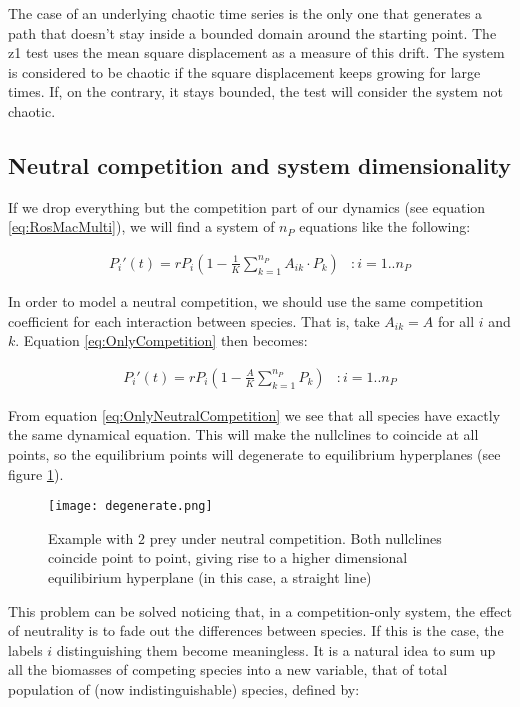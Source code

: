The case of an underlying chaotic time series is the only one that generates a path that doesn't stay inside a bounded domain around the starting point. The z1 test uses the mean square displacement as a measure of this drift. The system is considered to be chaotic if the square displacement keeps growing for large times. If, on the contrary, it stays bounded, the test will consider the system not chaotic.

\subsection{Neutral competition and system dimensionality}
\label{subsec:NeutralCompetition}
If we drop everything but the competition part of our dynamics (see equation \ref{eq:RosMacMulti}), we will find a system of $ n_P $ equations like the following:

\begin{eqnarray}
\label{eq:OnlyCompetition}
P_i'(t) = r P_i \left( 1 - \frac{1}{K} \sum_{k=1}^{n_P} A_{ik} \cdot P_k \right) & : i = 1..n_P
\end{eqnarray}

In order to model a neutral competition, we should use the same competition coefficient for each interaction between species. That is, take $ A_{ik} = A $ for all $ i $ and $ k $. Equation \ref{eq:OnlyCompetition} then becomes:

\begin{eqnarray}
\label{eq:OnlyNeutralCompetition}
P_i'(t) = r P_i \left( 1 - \frac{A}{K} \sum_{k=1}^{n_P} P_k \right) & : i = 1..n_P
\end{eqnarray}

From equation \ref{eq:OnlyNeutralCompetition} we see that all species have exactly the same dynamical equation. This will make the nullclines to coincide at all points, so the equilibrium points will degenerate to equilibrium hyperplanes (see figure \ref{fig:Neutral}).

\begin{figure}[h]
	\begin{center}
		\texttt{[image: degenerate.png]}
	\end{center}
	\caption{Example with $2$ prey under neutral competition. Both nullclines coincide point to point, giving rise to a higher dimensional equilibirium hyperplane (in this case, a straight line)}
	\label{fig:Neutral}
\end{figure}

This problem can be solved noticing that, in a competition-only system, the effect of neutrality is to fade out the differences between species. If this is the case, the labels $ i $ distinguishing them become meaningless. It is a natural idea to sum up all the biomasses of competing species into a new variable, that of total population of (now indistinguishable) species, defined by:

